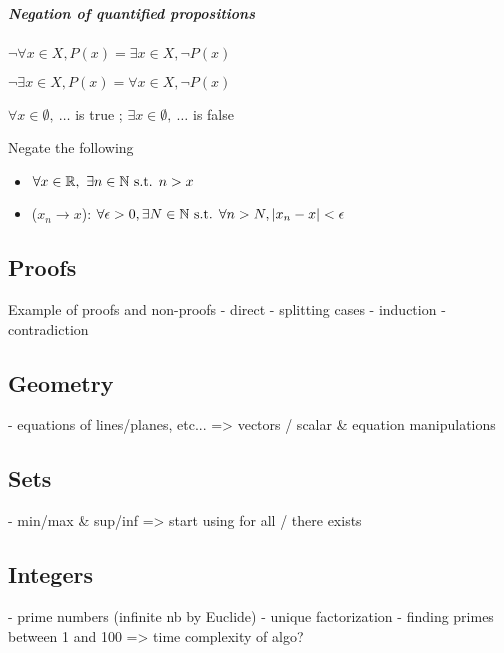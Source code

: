 \subparagraph{Negation of quantified propositions}
\begin{property}
    $\lnot \forall x\in X, P(x) = \exists x\in X, \lnot P(x)$
\end{property}
\begin{property}
    $\lnot \exists x\in X, P(x) = \forall x\in X, \lnot P(x)$
\end{property}
\begin{notation}
    $\forall x \in \emptyset, \ \dots$ is true ;
    $\exists x \in \emptyset, \ \dots$ is false
\end{notation}
\begin{question} Negate the following
    \begin{itemize}
        \item $\forall x \in \mathbb{R}, \ \exists n \in \mathbb{N} \text{ s.t. } n > x$
        \item ($x_n \to x$): $\forall \epsilon>0, \exists N \in \mathbb{N} \text{ s.t. } \forall n>N, | x_n-x |<\epsilon$
    \end{itemize}
\end{question}



\subsection{Proofs}
Example of proofs and non-proofs
- direct
- splitting cases
- induction
- contradiction
\subsection{Geometry}
- equations of lines/planes, etc... => vectors / scalar \& equation manipulations
\subsection{Sets}
- min/max \& sup/inf => start using for all / there exists
\subsection{Integers}
- prime numbers (infinite nb by Euclide)
- unique factorization 
- finding primes between 1 and 100 => time complexity of algo?